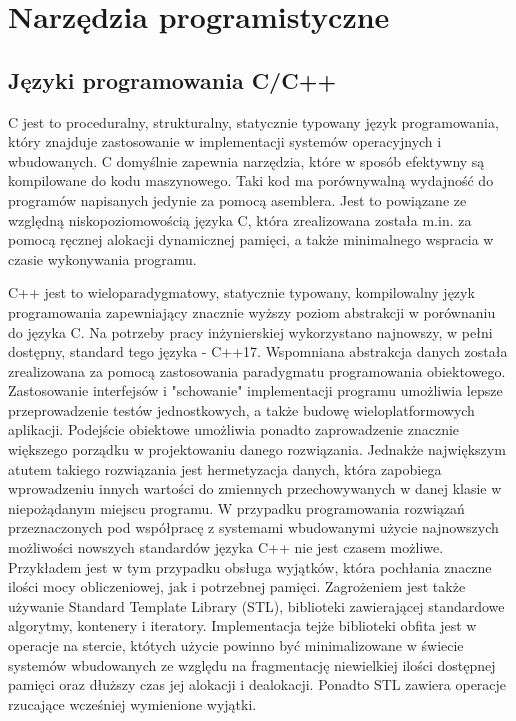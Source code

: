 \section{Narzędzia programistyczne} \label{sec:prog}

\subsection{Języki programowania C/C++} \label{sec:cpp}
C jest to proceduralny, strukturalny, statycznie typowany język programowania, który znajduje
zastosowanie w implementacji systemów operacyjnych i wbudowanych. C domyślnie zapewnia
narzędzia, które w sposób efektywny są kompilowane do kodu maszynowego. Taki kod ma porównywalną
wydajność do programów napisanych jedynie za pomocą asemblera. Jest to powiązane ze względną
niskopoziomowością języka C, która zrealizowana została m.in. za pomocą ręcznej alokacji
dynamicznej pamięci, a także minimalnego wspracia w czasie wykonywania programu. 
 
C++ jest to wieloparadygmatowy, statycznie typowany, kompilowalny język programowania zapewniający
znacznie wyższy poziom abstrakcji w porównaniu do języka C. Na potrzeby pracy inżynierskiej
wykorzystano najnowszy, w pełni dostępny, standard tego języka - C++17. 
Wspomniana abstrakcja danych została
zrealizowana za pomocą zastosowania paradygmatu programowania obiektowego. Zastosowanie interfejsów
i "schowanie" implementacji programu umożliwia lepsze przeprowadzenie testów jednostkowych, a także
budowę wieloplatformowych aplikacji. Podejście obiektowe umożliwia ponadto zaprowadzenie znacznie
większego porządku w projektowaniu danego rozwiązania. Jednakże największym atutem takiego 
rozwiązania jest hermetyzacja danych, która zapobiega wprowadzeniu innych wartości do zmiennych
przechowywanych w danej klasie w niepożądanym miejscu programu.
W przypadku programowania rozwiązań przeznaczonych pod współpracę z systemami wbudowanymi użycie
najnowszych możliwości nowszych standardów języka C++ nie jest czasem możliwe. Przykładem jest
w tym przypadku obsługa wyjątków, która pochłania znaczne ilości mocy obliczeniowej, jak
i potrzebnej pamięci. Zagrożeniem jest także używanie Standard Template Library (STL), biblioteki
zawierającej standardowe algorytmy, kontenery i iteratory. Implementacja tejże biblioteki obfita
jest w operacje na stercie, któtych użycie powinno być minimalizowane w świecie systemów
wbudowanych ze względu na fragmentację niewielkiej ilości dostępnej pamięci oraz dłuższy czas
jej alokacji i dealokacji. Ponadto STL zawiera operacje rzucające wcześniej wymienione wyjątki. 

